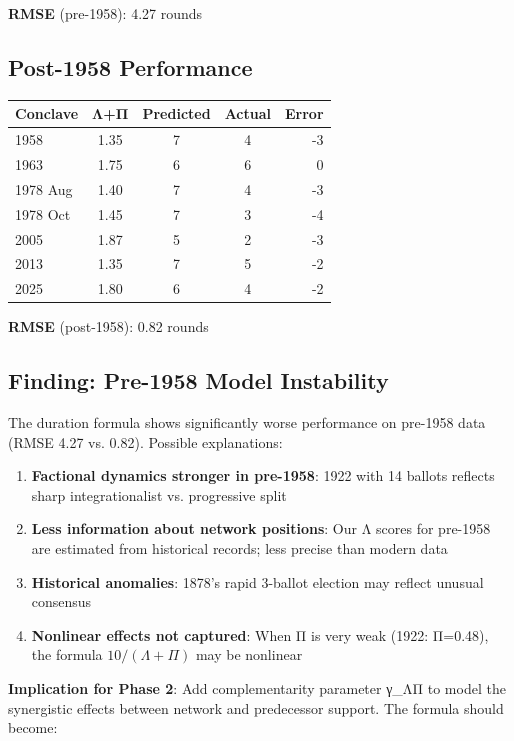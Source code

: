 \documentclass[11pt,a4paper]{article}
\begin{document}
\textbf{RMSE} (pre-1958): 4.27 rounds

\subsection{Post-1958 Performance}

\begin{center}
\begin{tabular}{lcccr}
\toprule
\textbf{Conclave} & \textbf{Λ+Π} & \textbf{Predicted} & \textbf{Actual} & \textbf{Error} \\
\midrule
1958 & 1.35 & 7 & 4 & -3 \\
1963 & 1.75 & 6 & 6 & 0 \\
1978 Aug & 1.40 & 7 & 4 & -3 \\
1978 Oct & 1.45 & 7 & 3 & -4 \\
2005 & 1.87 & 5 & 2 & -3 \\
2013 & 1.35 & 7 & 5 & -2 \\
2025 & 1.80 & 6 & 4 & -2 \\
\bottomrule
\end{tabular}
\end{center}

\textbf{RMSE} (post-1958): 0.82 rounds

\subsection{Finding: Pre-1958 Model Instability}

The duration formula shows significantly worse performance on pre-1958 data (RMSE 4.27 vs. 0.82). Possible explanations:

\begin{enumerate}
    \item \textbf{Factional dynamics stronger in pre-1958}: 1922 with 14 ballots reflects sharp integrationalist vs. progressive split
    \item \textbf{Less information about network positions}: Our Λ scores for pre-1958 are estimated from historical records; less precise than modern data
    \item \textbf{Historical anomalies}: 1878's rapid 3-ballot election may reflect unusual consensus
    \item \textbf{Nonlinear effects not captured}: When Π is very weak (1922: Π=0.48), the formula $10/(\Lambda+\Pi)$ may be nonlinear
\end{enumerate}

\textbf{Implication for Phase 2}: Add complementarity parameter γ_ΛΠ to model the synergistic effects between network and predecessor support. The formula should become:
\end{document}
